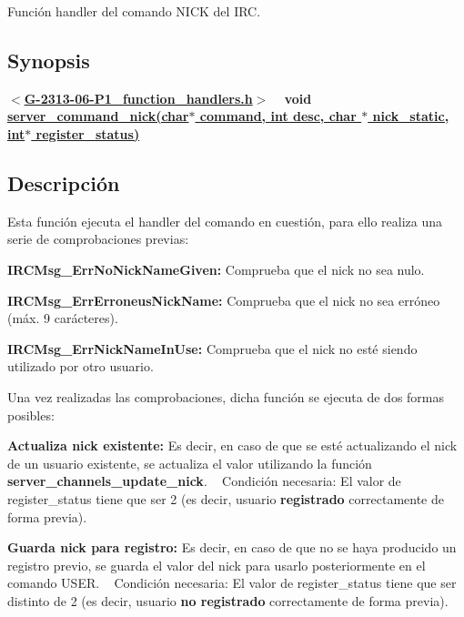 Función handler del comando N\+I\+C\+K del I\+R\+C.\hypertarget{server_command_nick_synopsis_nick}{}\subsection{Synopsis}\label{server_command_nick_synopsis_nick}
{ {\bfseries $<$\hyperlink{G-2313-06-P1__function__handlers_8h}{G-\/2313-\/06-\/\+P1\+\_\+function\+\_\+handlers.\+h}$>$} ~\newline
 {\bfseries void \hyperlink{G-2313-06-P1__function__handlers_8c_aeefab469ba48ce1655dd5afd14f104b4}{server\+\_\+command\+\_\+nick(char$\ast$ command, int desc, char $\ast$ nick\+\_\+static, int$\ast$ register\+\_\+status)}} } \hypertarget{server_command_nick_descripcion_nick}{}\subsection{Descripción}\label{server_command_nick_descripcion_nick}
Esta función ejecuta el handler del comando en cuestión, para ello realiza una serie de comprobaciones previas\+:


\begin{DoxyItemize}
\item {\bfseries I\+R\+C\+Msg\+\_\+\+Err\+No\+Nick\+Name\+Given\+:} Comprueba que el nick no sea nulo. 
\item {\bfseries I\+R\+C\+Msg\+\_\+\+Err\+Erroneus\+Nick\+Name\+:} Comprueba que el nick no sea erróneo (máx. 9 carácteres). 
\item {\bfseries I\+R\+C\+Msg\+\_\+\+Err\+Nick\+Name\+In\+Use\+:} Comprueba que el nick no esté siendo utilizado por otro usuario. 
\end{DoxyItemize}

Una vez realizadas las comprobaciones, dicha función se ejecuta de dos formas posibles\+:


\begin{DoxyItemize}
\item {\bfseries Actualiza nick existente\+:} Es decir, en caso de que se esté actualizando el nick de un usuario existente, se actualiza el valor utilizando la función {\bfseries server\+\_\+channels\+\_\+update\+\_\+nick}. ~\newline
Condición necesaria\+: El valor de register\+\_\+status tiene que ser 2 (es decir, usuario {\bfseries registrado} correctamente de forma previa).  
\item {\bfseries Guarda nick para registro\+:} Es decir, en caso de que no se haya producido un registro previo, se guarda el valor del nick para usarlo posteriormente en el comando U\+S\+E\+R. ~\newline
Condición necesaria\+: El valor de register\+\_\+status tiene que ser distinto de 2 (es decir, usuario {\bfseries no registrado} correctamente de forma previa).  
\end{DoxyItemize}

